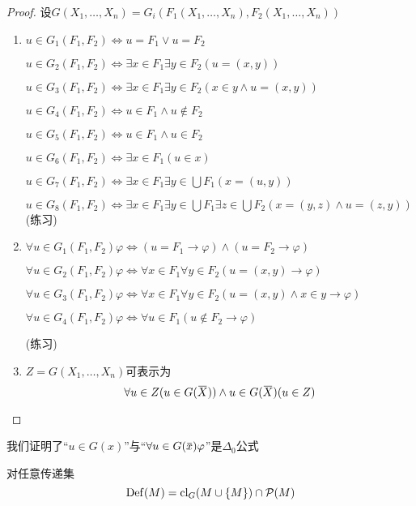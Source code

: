 \documentclass[11pt]{article}
\begin{document}
\begin{proof}
设\(G(X_1,\dots,X_n)=G_i(F_1(X_1,\dots,X_n),F_2(X_1,\dots,X_n))\)
\begin{enumerate}
\item \(u\in G_1(F_1,F_2)\Leftrightarrow u=F_1\vee u=F_2\)

\(u\in G_2(F_1,F_2)\Leftrightarrow\exists x\in F_1\exists y\in F_2(u=(x,y))\)

\(u\in G_3(F_1,F_2)\Leftrightarrow\exists x\in F_1\exists y\in F_2(x\in y\wedge u=(x,y))\)

\(u\in G_4(F_1,F_2)\Leftrightarrow u\in F_1\wedge u\notin F_2\)

\(u\in G_5(F_1,F_2)\Leftrightarrow u\in F_1\wedge u\in F_2\)

\(u\in G_6(F_1,F_2)\Leftrightarrow\exists x\in F_1(u\in x)\)

\(u\in G_7(F_1,F_2)\Leftrightarrow\exists x\in F_1\exists y\in\bigcup F_1(x=(u,y))\)

\(u\in G_8(F_1,F_2)\Leftrightarrow\exists x\in F_1\exists y\in\bigcup F_1\exists z\in\bigcup F_2(x=(y,z)\wedge u=(z,y))\)
(练习)
\item \(\forall u\in G_1(F_1,F_2)\varphi\Leftrightarrow(u=F_1\to\varphi)\wedge(u=F_2\to\varphi)\)

\(\forall u\in G_2(F_1,F_2)\varphi\Leftrightarrow\forall x\in F_1\forall y\in F_2(u=(x,y)\to\varphi)\)

\(\forall u\in G_3(F_1,F_2)\varphi\Leftrightarrow\forall x\in F_1\forall y\in F_2(u=(x,y)\wedge x\in y\to\varphi)\)

\(\forall u\in G_4(F_1,F_2)\varphi\Leftrightarrow\forall u\in F_1(u\notin F_2\to\varphi)\)

(练习)
\item \(Z=G(X_1,\dots,X_n)\)可表示为
\begin{equation*}
\forall u\in Z(u\in G(\barX))\wedge u\in G(\barX)(u\in Z)
\end{equation*}
\end{enumerate}
\end{proof}

\begin{remark}
我们证明了“\(u\in G(x)\)”与“\(\forall u\in G(\barx)\varphi\)”是\(\Delta_0\)公式
\end{remark}


\begin{theorem}[]
对任意传递集
\begin{equation*}
\operatorname{Def}(M)=\operatorname{\text{cl}}_G(M\cup\{M\})\cap\mathcal{P}(M)
\end{equation*}
\end{theorem}
\end{document}
